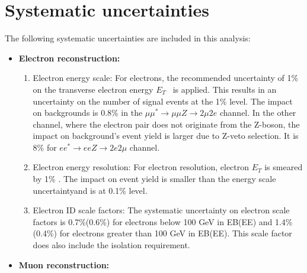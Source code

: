 \section{Systematic uncertainties}

\label{sec:Systematics}

The following systematic uncertainties are included in this analysis:

\begin{itemize}
	\item \textbf{Electron reconstruction:}
		\begin{enumerate}
		        \item Electron energy scale: For electrons, the recommended uncertainty of 1$\%$ on the transverse electron energy 
                              $E_{T}$~\cite{DP-12-007} is applied. This results in an uncertainty on the number of signal events at the 1\% level. 
                              The impact on backgrounds is 0.8\% in the $\mu\mu^{*}\rightarrow \mu\mu Z \rightarrow 2\mu2e$ channel. 
                              In the other channel, where the electron pair does not originate from the Z-boson, the impact on background's event yield is 
                              larger due to Z-veto selection. 
                              It is 8\% for $ee^{*}\rightarrow eeZ\rightarrow 2e2\mu$ channel.   
			\item Electron energy resolution: For electron resolution, electron $E_{T}$ is smeared by 1$\%$ \cite{AN-12-415}. The impact on event yield is smaller than the energy scale uncertaintyand is at 0.1\% level.  
			\item Electron ID scale factors: The systematic uncertainty on electron scale factors is 0.7\%(0.6\%) for electrons below 100 GeV in EB(EE) and 1.4\%(0.4\%) for electrons greater than 100 GeV in EB(EE)\cite{heepSFsyst}. This scale factor does also include the isolation requirement. 
		\end{enumerate}
	\item \textbf{Muon reconstruction:} 

\end{itemize}
